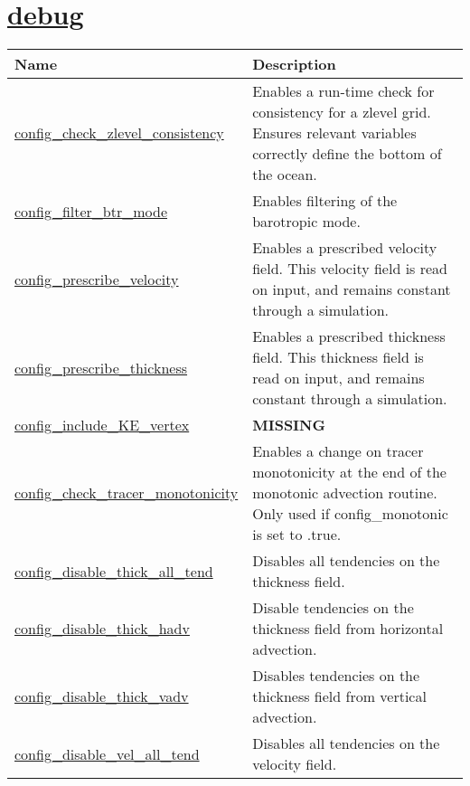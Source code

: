 \section[debug]{\hyperref[sec:nm_sec_debug]{debug}}
\label{sec:nm_tab_debug}

{\small
\begin{center}
\begin{longtable}{| p{2.0in} || p{4.0in} |}
	\hline
	{\bf Name} & {\bf Description} \\
	\hline
	\hline
	\hyperref[subsec:nm_sec_config_check_zlevel_consistency]{config\_check\_zlevel\_consistency} & Enables a run-time check for consistency for a zlevel grid. Ensures relevant variables correctly define the bottom of the ocean. \\
	\hline
	\hyperref[subsec:nm_sec_config_filter_btr_mode]{config\_filter\_btr\_mode} & Enables filtering of the barotropic mode. \\
	\hline
	\hyperref[subsec:nm_sec_config_prescribe_velocity]{config\_prescribe\_velocity} & Enables a prescribed velocity field. This velocity field is read on input, and remains constant through a simulation. \\
	\hline
	\hyperref[subsec:nm_sec_config_prescribe_thickness]{config\_prescribe\_thickness} & Enables a prescribed thickness field. This thickness field is read on input, and remains constant through a simulation. \\
	\hline
	\hyperref[subsec:nm_sec_config_include_KE_vertex]{config\_include\_KE\_vertex} & {\bf \color{red} MISSING} \\
	\hline
	\hyperref[subsec:nm_sec_config_check_tracer_monotonicity]{config\_check\_tracer\_monotonicity} & Enables a change on tracer monotonicity at the end of the monotonic advection routine. Only used if config\_monotonic is set to .true. \\
	\hline
	\hyperref[subsec:nm_sec_config_disable_thick_all_tend]{config\_disable\_thick\_all\_tend} & Disables all tendencies on the thickness field. \\
	\hline
	\hyperref[subsec:nm_sec_config_disable_thick_hadv]{config\_disable\_thick\_hadv} & Disable tendencies on the thickness field from horizontal advection. \\
	\hline
	\hyperref[subsec:nm_sec_config_disable_thick_vadv]{config\_disable\_thick\_vadv} & Disables tendencies on the thickness field from vertical advection. \\
	\hline
	\hyperref[subsec:nm_sec_config_disable_vel_all_tend]{config\_disable\_vel\_all\_tend} & Disables all tendencies on the velocity field. \\

\end{longtable}
\end{center}}
